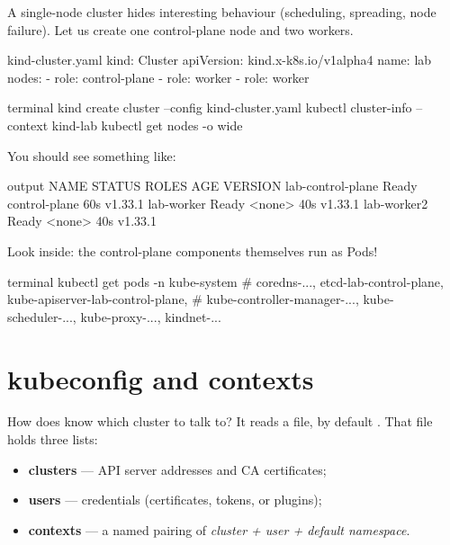 A single-node cluster hides interesting behaviour (scheduling, spreading,
node failure). Let us create one control-plane node and two workers.

\begin{yamlcode}{kind-cluster.yaml}
kind: Cluster
apiVersion: kind.x-k8s.io/v1alpha4
name: lab
nodes:
  - role: control-plane
  - role: worker
  - role: worker
\end{yamlcode}

\begin{bashcode}{terminal}
kind create cluster --config kind-cluster.yaml
kubectl cluster-info --context kind-lab
kubectl get nodes -o wide
\end{bashcode}

You should see something like:

\begin{plaincode}{output}
NAME                STATUS   ROLES           AGE   VERSION
lab-control-plane   Ready    control-plane   60s   v1.33.1
lab-worker          Ready    <none>          40s   v1.33.1
lab-worker2         Ready    <none>          40s   v1.33.1
\end{plaincode}

Look inside: the control-plane components themselves run as Pods!

\begin{bashcode}{terminal}
kubectl get pods -n kube-system
# coredns-..., etcd-lab-control-plane, kube-apiserver-lab-control-plane,
# kube-controller-manager-..., kube-scheduler-..., kube-proxy-..., kindnet-...
\end{bashcode}

\section{kubeconfig and contexts}

How does  know which cluster to talk to? It reads a
 file, by default . That file
holds three lists:

\begin{itemize}
  \item \textbf{clusters} --- API server addresses and CA certificates;
  \item \textbf{users} --- credentials (certificates, tokens, or plugins);
  \item \textbf{contexts} --- a named pairing of \emph{cluster + user + default namespace}.
\end{itemize}

